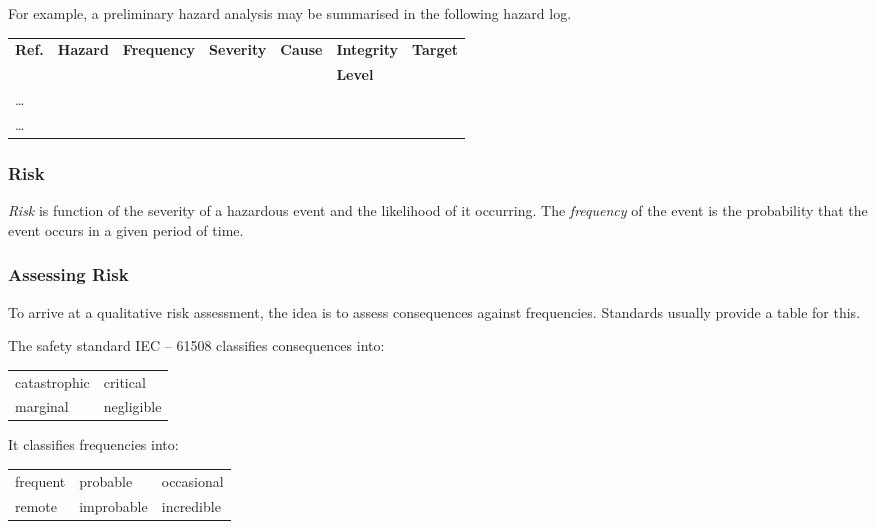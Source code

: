 For example, a preliminary hazard analysis may be summarised in the 
following hazard log.

\begin{center}
   \begin{tabular}{lllllll}
     \toprule
     \textbf{Ref.} & \textbf{Hazard} & \textbf{Frequency} &
     \textbf{Severity} & \textbf{Cause} & 
     \textbf{Integrity} & \textbf{Target} \\
     & & & & & \textbf{Level} &  \\
     \midrule
     \ldots & & & & &  & \\
     \ldots & & & & &  & \\
     \bottomrule
    \end{tabular}
\end{center}


  \subsubsection{Risk}


 \emph{Risk} is function of the severity of a hazardous event and the
 likelihood of it occurring. The \emph{frequency} of the event is the
 probability that the event occurs in a given period of time.
        
  \subsubsection*{Assessing Risk}

 To arrive at a qualitative risk assessment, the idea is to
  assess consequences against frequencies.  Standards usually provide
  a table for this.

    The safety standard IEC -- 61508 classifies consequences into: 
      \begin{center}
            \begin{tabular}{ll} 
              catastrophic & critical \\
              marginal     & negligible
            \end{tabular}
        \end{center}

    It classifies frequencies into:
        \begin{center}
            \begin{tabular}{lll}
                frequent & probable & occasional \\
                remote   & improbable & incredible
            \end{tabular}
        \end{center}

